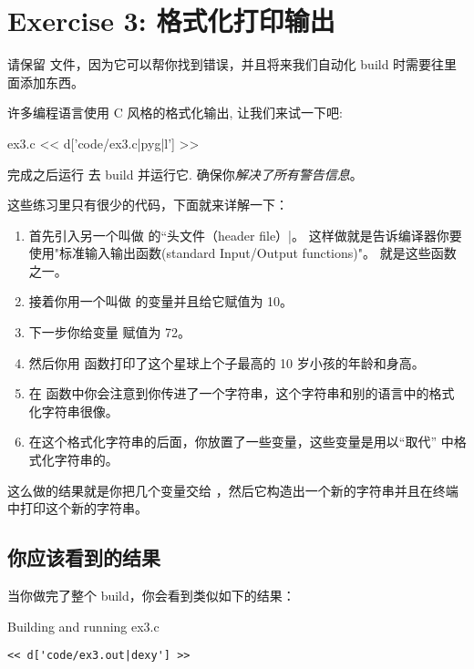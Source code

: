 \chapter{Exercise 3: 格式化打印输出}

请保留  文件，因为它可以帮你找到错误，并且将来我们自动化 build 时需要往里面添加东西。

许多编程语言使用 C 风格的格式化输出, 让我们来试一下吧:

\begin{code}{ex3.c}
<< d['code/ex3.c|pyg|l'] >>
\end{code}

完成之后运行  去 build 并运行它. 
确保你\emph{解决了所有警告信息}。

这些练习里只有很少的代码，下面就来详解一下：

\begin{enumerate}
\item 首先引入另一个叫做  的“头文件（header file）|。 这样做就是告诉编译器你要使用"标准输入输出函数(standard Input/Output functions)"。 就是这些函数之一。
\item 接着你用一个叫做  的变量并且给它赋值为 10。
\item 下一步你给变量  赋值为 72。
\item 然后你用  函数打印了这个星球上个子最高的 10  岁小孩的年龄和身高。
\item 在  函数中你会注意到你传进了一个字符串，这个字符串和别的语言中的格式化字符串很像。
\item 在这个格式化字符串的后面，你放置了一些变量，这些变量是用以“取代”  中格式化字符串的。
\end{enumerate}

这么做的结果就是你把几个变量交给 ，然后它构造出一个新的字符串并且在终端中打印这个新的字符串。

\section{你应该看到的结果}

当你做完了整个 build，你会看到类似如下的结果：

\begin{Terminal}{Building and running ex3.c}
\begin{lstlisting}
<< d['code/ex3.out|dexy'] >>
\end{lstlisting}
\end{Terminal}

